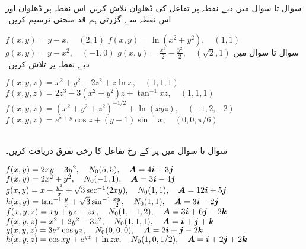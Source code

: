 \\
سوال  تا سوال  میں دیے نقطہ پر تفاعل کی ڈھلوان  تلاش کریں۔اس  نقطہ پر ڈھلوان اور اس نقطہ سے گزرتی   ہم قد منحنی  ترسیم کریں۔

$f(x,y)=y-x,\quad (2,1)$
$f(x,y)=\ln(x^2+y^2),\quad (1,1)$
$g(x,y)=y-x^2,\quad (-1,0)$
$g(x,y)=\frac{x^2}{2}-\frac{y^2}{2},\quad (\sqrt{2},1)$
سوال  تا سوال  میں دیے نقطہ پر  تلاش کریں۔

$f(x,y,z)=x^2+y^2-2z^2+z\ln x,\quad (1,1,1)$
$f(x,y,z)=2z^3-3(x^2+y^2)z+\tan^{-1}xz,\quad (1,1,1)$
$f(x,y,z)=(x^2+y^2+z^2)^{-1/2}+\ln(xyz),\quad (-1,2,-2)$
$f(x,y,z)=e^{x+y}\cos z+(y+1)\sin^{-1}x,\quad (0,0,\pi/6)$

\\
سوال  تا سوال  میں  پر  کے رخ تفاعل کا رخی تفرق دریافت کریں۔

$f(x,y)=2xy-3y^2,\quad N_0(5,5),\quad {\ensuremath{{\boldsymbol{A}}}}=4{\boldsymbol{i}}+3{\boldsymbol{j}}$
$f(x,y)=2x^2+y^2,\quad N_0(-1,1),\quad {\ensuremath{{\boldsymbol{A}}}}=3{\boldsymbol{i}}-4{\boldsymbol{j}}$
$g(x,y)=x-\frac{y^2}{x}+\sqrt{3}\sec^{-1}(2xy),\quad N_0(1,1),\quad {\ensuremath{{\boldsymbol{A}}}}=12{\boldsymbol{i}}+5{\boldsymbol{j}}$
$h(x,y)=\tan^{-1}\frac{y}{x}+\sqrt{3}\sin^{-1}\frac{xy}{2},\quad N_0(1,1),\quad {\ensuremath{{\boldsymbol{A}}}}=3{\boldsymbol{i}}-2{\boldsymbol{j}}$
$f(x,y,z)=xy+yz+zx,\quad N_0(1,-1,2),\quad {\ensuremath{{\boldsymbol{A}}}}=3{\boldsymbol{i}}+6{\boldsymbol{j}}-2{\boldsymbol{k}}$
$f(x,y,z)=x^2+2y^2-3z^2,\quad N_0(1,1,1),\quad {\ensuremath{{\boldsymbol{A}}}}={\boldsymbol{i}}+{\boldsymbol{j}}+{\boldsymbol{k}}$
$g(x,y,z)=3e^x\cos yz,\quad N_0(0,0,0),\quad {\ensuremath{{\boldsymbol{A}}}}=2{\boldsymbol{i}}+{\boldsymbol{j}}-2{\boldsymbol{k}}$
$h(x,y,z)=\cos xy+e^{yz}+\ln zx,\quad N_0(1,0,1/2),\quad {\ensuremath{{\boldsymbol{A}}}}={\boldsymbol{i}}+2{\boldsymbol{j}}+2{\boldsymbol{k}}$

